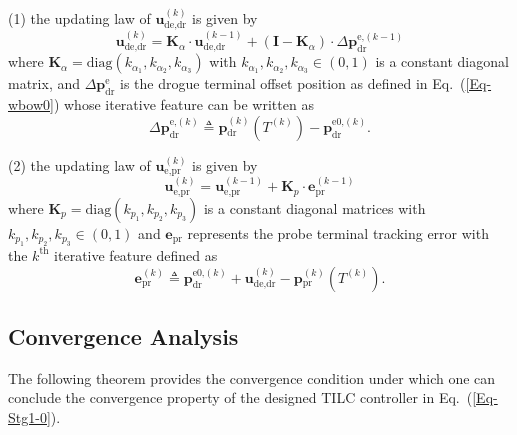 (1) the updating law of $\mathbf{u}_{\text{de,dr}}^{\left(k\right)}$
is given by
\begin{equation}
\mathbf{u}_{\text{de,dr}}^{\left(k\right)}=\mathbf{K}_{\alpha}\cdot\mathbf{u}_{\text{de,dr}}^{\left(k-1\right)}+\left(\mathbf{I}-\mathbf{K}_{\alpha}\right)\cdot\Delta{\mathbf{p}}_{\text{dr}}^{\text{e,}\left(k-1\right)}\label{Eq-Stg2-0}
\end{equation}
where $\mathbf{K}_{\alpha}=\text{diag}\left(k_{\alpha_{1}},k_{\alpha_{2}},k_{\alpha_{3}}\right)$
with $k_{\alpha_{1}},k_{\alpha_{2}},k_{\alpha_{3}}\in\left(0,1\right)$
is a constant diagonal matrix, and $\Delta{\mathbf{p}}_{\text{dr}}^{\text{e}}$
is the drogue terminal offset position as defined in Eq.~(\ref{Eq-wbow0})
whose iterative feature can be written as
\begin{equation}
\Delta{\mathbf{p}}_{\text{dr}}^{\text{e,}\left(k\right)}\triangleq\mathbf{p}{_{\text{dr}}^{(k)}}\left(T^{\left(k\right)}\right)-{\mathbf{p}}_{\text{dr}}^{\text{e0,}\left(k\right)}.\label{Eq-Stg2-1}
\end{equation}

(2) the updating law of $\mathbf{u}_{\text{e,pr}}^{\left(k\right)}$
is given by
\begin{equation}
\mathbf{u}_{\text{e,pr}}^{\left(k\right)}=\mathbf{u}_{\text{e,pr}}^{\left(k-1\right)}+\mathbf{K}_{p}\cdot\mathbf{e}_{\text{pr}}^{(k-1)}\label{Eq-Stg2-3}
\end{equation}
where $\mathbf{K}_{p}=\text{diag}\left(k_{p_{1}},k_{p_{2}},k_{p_{3}}\right)$
is a constant diagonal matrices with $k_{p_{1}},k_{p_{2}},k_{p_{3}}\in\left(0,1\right)$
and $\mathbf{e}_{\text{pr}}$ represents the probe terminal tracking
error with the $k^{\text{th}}$ iterative feature defined as
\begin{equation}
\mathbf{e}_{\text{pr}}^{(k)}\triangleq{\mathbf{p}}_{\text{dr}}^{\text{e0,}\left(k\right)}+\mathbf{u}_{\text{de,dr}}^{\left(k\right)}-\mathbf{p}{_{\text{pr}}^{(k)}}\left(T^{\left(k\right)}\right).\label{Eq-Stg2-4}
\end{equation}

\subsection{Convergence Analysis }

The following theorem provides the convergence condition under which
one can conclude the convergence property of the designed TILC controller
in Eq.\ (\ref{Eq-Stg1-0}).

